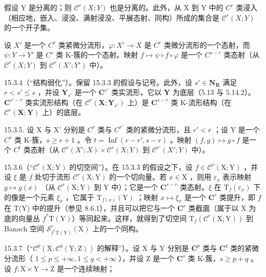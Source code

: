 假设 Y 是分离的；则 \(\mathcal{C}^{r}(X;Y)\) 也是分离的。此外，从 X 到 Y 中的 \(C^{r}\) 类浸入（相应地，嵌入、浸没、满射浸没、平展态射、同构）所成的集合是 \(\mathcal{C}^{r}(X;Y)\) 的一个开子集。

设 \(X'\) 是一个 \(C^r\) 类紧微分流形，\(\varphi: X' \to X\) 是 \(C^r\) 类微分流形的一个态射，而 \(\psi: Y \to Y'\) 是 \(C^s\) 类 K-簇的一个态射。映射 \(f \mapsto \psi \circ f \circ \varphi\) 是一个 \(C^{s-r}\) 类态射（从 \(\mathscr{C}^r(X; Y)\) 到 \(\mathscr{C}^r(X'; Y')\) 中）。

15.3.4（“结构弱化”）。保留 15.3.3 的假设与记号。此外，设 \(s' \in \mathbf{N}_{\mathbf{R}}\) 满足 \(r < s' \leqslant s\) ，并设 \(\mathbf{Y}_{s'}\) 是一个 \(\mathbf{C}^{s'}\) 类实流形，它以 \(\mathbf{Y}\) 为底层（5.13 与 5.14.2）。\(\mathbf{C}^{s'-r}\) 类实流形结构（在 \(\mathcal{C}^r(\mathbf{X}; \mathbf{Y}_{s'})\) 上）是 \(\mathbf{C}^{s-r}\) 类 K-流形结构（在 \(\mathcal{C}^r(\mathbf{X}; \mathbf{Y})\) 上）的底层。

15.3.5. 设 X 与 X' 分别是 \(C^{r}\) 类与 \(C^{r'}\) 类的紧微分流形，且 \(r' < r\) ；设 Y 是一个 \(C^{s}\) 类 K-簇，\(s \geqslant r + 1\) 。令 \(t = \operatorname{Inf}(r - r', s - r)\) 。映射 \((f, g) \mapsto g \circ f\) 是一个 \(C^{t}\) 类态射（从 \(\mathcal{C}^{r}(X'; X) \times \mathcal{C}^{r}(X; Y)\) 到 \(\mathcal{C}^{r'}(X'; Y)\) 中）。

15.3.6（“\(\mathcal{C}^r (\mathrm{X};\mathrm{Y})\) 的切空间”）。在 15.3.3 的假设之下，设 \(f\in \mathcal{C}^r (\mathrm{X};\mathrm{Y})\) ，并设 \(\xi\) 是 \(f\) 处切于流形 \(\mathcal{C}^r (\mathrm{X};\mathrm{Y})\) 的一个切向量。若 \(x\in \mathrm{X}\) ，则用 \(\varepsilon_{x}\) 表示映射 \(g\mapsto g(x)\) （从 \(\mathcal{C}^r (\mathrm{X};\mathrm{Y})\) 到 Y 中）；它是一个 \(\mathbf{C}^{s - r}\) 类态射。\(\xi\) 在 \(\mathrm{T}_f(\varepsilon_x)\) 下的像是一个元素 \(\xi_{x}\) ，它属于 \(\mathrm{T}_{f(x)}(\mathrm{Y})\) ；映射 \(x\mapsto \xi_{x}\) 是一个 \(\mathbf{C}^r\) 类提升，即 \(f\) 在 T(Y) 中的提升（参见 8.6.1），并且可以把它与一个 \(\mathbf{C}^r\) 类截面（属于以 X 为底的向量丛 \(f^{*}\mathrm{T}(\mathrm{Y})\)）等同起来。这样，就得到了切空间 \(\mathrm{T}_f(\mathcal{C}^r (\mathrm{X};\mathrm{Y}))\) 到 Banach 空间 \(\mathcal{S}_{f^{*}\mathrm{T}(\mathrm{Y})}^r (\mathrm{X})\) 上的一个同构。

15.3.7（“\(\mathcal{C}^{p}(\mathrm{X};\mathcal{C}^{q}(\mathrm{Y};\mathrm{Z}))\) 的解释”）。设 X 与 Y 分别是 \(\mathbf{C}^{p}\) 类与 \(\mathbf{C}^{q}\) 类的紧微分流形（ \(1\leqslant p\leqslant+\infty,1\leqslant q<+\infty\) ），并设 Z 是一个 \(\mathbf{C}^{s}\) 类 K-簇，\(s\geqslant p+q\) 。设 \(f\colon\mathrm{X}\times\mathrm{Y}\to\mathrm{Z}\) 是一个连续映射；

